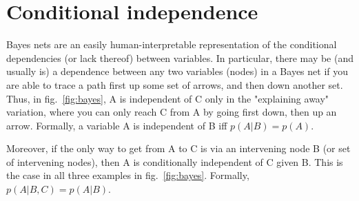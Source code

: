 \section{Conditional independence}

Bayes nets are an easily human-interpretable representation of the conditional
dependencies (or lack thereof) between variables. In particular, there may be
(and usually is) a dependence between any two variables (nodes) in a Bayes net
if you are able to trace a path first up some set of arrows, and then down
another set. Thus, in fig.~\ref{fig:bayes}, A is independent of C only in the
"explaining away" variation, where you can only reach C from A by going first
down, then up an arrow. Formally, a variable A is independent of B iff 
$p(A|B) = p(A)$.

Moreover, if the only way to get from A to C is via an intervening node B (or set
of intervening nodes), then A is conditionally independent of C given B. This is
the case in all three examples in fig.~\ref{fig:bayes}. Formally, 
$p(A|B,C) = p(A|B)$.
